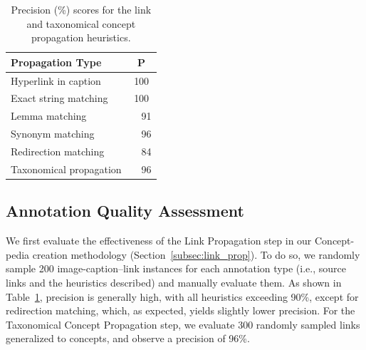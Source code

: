 \documentclass[11pt]{article}
\newcommand{\resource}{Concept-pedia}
\begin{document}



\begin{table}[t]
    \centering
    \setlength{\tabcolsep}{20pt}
    \begin{tabular}{lc}
        \toprule
        \textbf{Propagation Type} & \textbf{P} \\
        \midrule
       Hyperlink in caption & 100 \\
        Exact string matching & 100 \\
        Lemma matching & ~~91 \\
        Synonym matching & ~~96 \\
        Redirection matching & ~~84 \\
        \midrule
        Taxonomical propagation & ~~96\\
        \bottomrule
    \end{tabular}
    \caption{Precision (\%) scores for the link and taxonomical concept propagation   heuristics.}
    \label{tab:precision_types}
\end{table}


\subsection{Annotation Quality Assessment}
We first evaluate the effectiveness of the Link Propagation step in our \resource{} creation methodology (Section~\ref{subsec:link_prop}). To do so, we randomly sample 200 image-caption–link instances for each annotation type (i.e., source links and the heuristics described) and manually evaluate them. 
As shown in Table~\ref{tab:precision_types}, precision is generally high, with all heuristics exceeding 90\%, except for redirection matching, which, as expected, yields slightly lower precision.
For the Taxonomical Concept Propagation step, we evaluate 300 randomly sampled links generalized to concepts, and observe a precision of 96\%.

\end{document}

